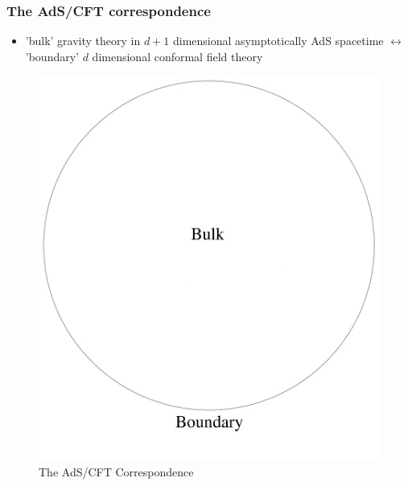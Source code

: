 \documentclass[10pt,aspectratio=169]{beamer}
\begin{document}
\begin{frame}
\frametitle{The AdS/CFT correspondence}

\begin{minipage}[t]{0.48\linewidth}

\begin{itemize}

\item 'bulk' gravity theory in $d+1$ dimensional  asymptotically AdS spacetime $\leftrightarrow$ 'boundary' $d$ dimensional conformal field theory

\end{itemize}

\end{minipage}
%
\hfill
%
\begin{minipage}[t]{0.48\linewidth}

\begin{figure}
    \begin{center}
    
        \includegraphics[scale=0.06]{adscft}    
    
    \end{center}
    \caption{The AdS/CFT Correspondence}
    \label{fig:WDW}
\end{figure}

\end{minipage}

\end{frame}
\end{document}

